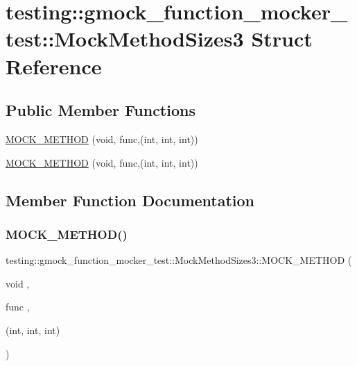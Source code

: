 \hypertarget{structtesting_1_1gmock__function__mocker__test_1_1_mock_method_sizes3}{}\section{testing\+::gmock\+\_\+function\+\_\+mocker\+\_\+test\+::Mock\+Method\+Sizes3 Struct Reference}
\label{structtesting_1_1gmock__function__mocker__test_1_1_mock_method_sizes3}
\subsection*{Public Member Functions}
\begin{DoxyCompactItemize}
\item 
\mbox{\hyperlink{structtesting_1_1gmock__function__mocker__test_1_1_mock_method_sizes3_ad85fc73275d13ba9b6ced01e5ef832cc}{M\+O\+C\+K\+\_\+\+M\+E\+T\+H\+OD}} (void, func,(int, int, int))
\item 
\mbox{\hyperlink{structtesting_1_1gmock__function__mocker__test_1_1_mock_method_sizes3_ad85fc73275d13ba9b6ced01e5ef832cc}{M\+O\+C\+K\+\_\+\+M\+E\+T\+H\+OD}} (void, func,(int, int, int))
\end{DoxyCompactItemize}


\subsection{Member Function Documentation}
\mbox{\label{structtesting_1_1gmock__function__mocker__test_1_1_mock_method_sizes3_ad85fc73275d13ba9b6ced01e5ef832cc}} 
\subsubsection{\texorpdfstring{MOCK\_METHOD()}{MOCK\_METHOD()}\hspace{0.1cm}{\footnotesize\ttfamily [1/2]}}
{\footnotesize\ttfamily testing\+::gmock\+\_\+function\+\_\+mocker\+\_\+test\+::\+Mock\+Method\+Sizes3\+::\+M\+O\+C\+K\+\_\+\+M\+E\+T\+H\+OD (\begin{DoxyParamCaption}\item[{void}]{,  }\item[{func}]{,  }\item[{(int, int, int)}]{ }\end{DoxyParamCaption})}


